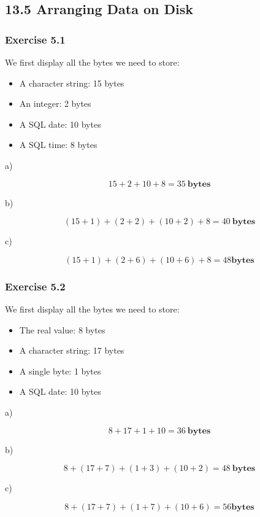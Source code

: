 \documentclass[../../main.tex]{subfiles}
\begin{document}
\subsection*{13.5 Arranging Data on Disk}

\hypertarget{Exercise13.5.1}{\subsubsection*{Exercise 5.1}}

We first display all the bytes we need to store:

\begin{itemize}
  \item A character string: 15 bytes
  \item An integer: 2 bytes
  \item A SQL date: 10 bytes
  \item A SQL time: 8 bytes
\end{itemize}

a)

$$
15 + 2 + 10 + 8 = 35 \ \mathbf{bytes}
$$

b)

$$
(15 + 1) + (2 + 2) + (10 + 2) + 8 = 40 \ \mathbf{bytes}
$$

c)

$$
(15 + 1) + (2 + 6) + (10 + 6) + 8 = 48 \mathbf{bytes}
$$

\hypertarget{Exercise13.5.2}{\subsubsection*{Exercise 5.2}}

We first display all the bytes we need to store:

\begin{itemize}
  \item The real value: 8 bytes
  \item A character string:  17 bytes
  \item A single byte: 1 bytes
  \item A SQL date: 10 bytes
\end{itemize}

a)

$$
8 + 17 + 1 + 10 = 36 \ \mathbf{bytes}
$$

b)

$$
8 + (17 + 7) + (1 + 3) + (10 + 2) = 48 \ \mathbf{bytes}
$$

c)

$$
8 + (17 + 7) + (1 + 7) + (10 + 6) = 56 \mathbf{bytes}
$$
\end{document}
